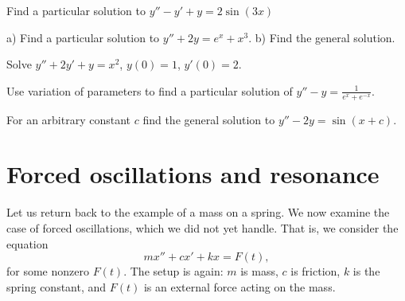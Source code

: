\setcounter{exercise}{100}

\begin{exercise}
Find a particular solution to $y''-y'+y=2\sin(3x)$
\end{exercise}

\begin{exercise}
a) Find a particular solution to $y''+2y=e^x + x^3$.
b) Find the general solution.
\end{exercise}

\begin{exercise}
Solve $y''+2y'+y = x^2$, $y(0)=1$, $y'(0)=2$.
\end{exercise}

\begin{exercise}
Use variation of parameters to
find a particular solution of $y''-y = \frac{1}{e^x+e^{-x}}$.
\end{exercise}

\begin{exercise}
For an arbitrary constant $c$ find the general solution
to $y''-2y=\sin(x+c)$.
\end{exercise}




\sectionnewpage
\section{Forced oscillations and resonance} \label{forcedo:section}


\begin{mywrapfigsimp}{2.0in}{2.3in}
\diffypdfversion{\vspace*{-10pt}}
\noindent
{}
\end{mywrapfigsimp}
Let us return back to the example of a mass on a spring.  We now examine
the case of forced oscillations, which we did not yet handle.  That is, we consider the equation
\begin{equation*}
mx'' + cx' + kx = F(t) ,
\end{equation*}
for some nonzero $F(t)$.  The setup
is again: $m$ is mass, $c$ is friction, $k$ is the spring constant, and
$F(t)$ is an external force acting on the mass.


